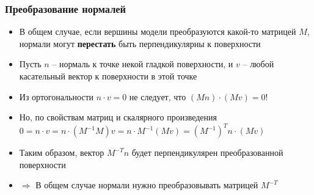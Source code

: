 \documentclass[10pt]{beamer}
\begin{document}
\begin{frame}[fragile]
\frametitle{Преобразование нормалей}
\begin{itemize}
\item В общем случае, если вершины модели преобразуются какой-то матрицей \begin{math}M\end{math}, нормали могут \textbf{перестать} быть перпендикулярны к поверхности
\pause
\item Пусть \begin{math}n\end{math} -- нормаль к точке некой гладкой поверхности, и \begin{math}v\end{math} -- любой касательный вектор к поверхности в этой точке
\pause
\item Из ортогональности \begin{math}n\cdot v = 0\end{math} не следует, что \begin{math}(Mn)\cdot (Mv)=0\end{math}!
\pause
\item Но, по свойствам матриц и скалярного произведения \begin{math}0 = n\cdot v = n\cdot (M^{-1}M)v = n\cdot M^{-1}(Mv) = (M^{-1})^T n \cdot (Mv)\end{math}
\pause
\item Таким образом, вектор \begin{math}M^{-T} n\end{math} будет перпендикулярен преобразованной поверхности
\pause
\item \begin{math}\Longrightarrow\end{math} В общем случае нормали нужно преобразовывать матрицей \begin{math}M^{-T}\end{math}
\end{itemize}
\end{frame}
\end{document}
